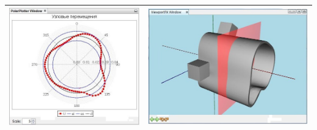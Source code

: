 \documentclass[14pt,oneside,final]{extreport}
\begin{document}
\begin{appendices}
\begin{table}[]
{{\begin{tabu}[]{|c|c|}
					\includegraphics[scale=0.55]{img/plane-position-test3} & \includegraphics[scale=0.55]{img/plane-position-test3-model}  \\ 
					\hline
				\end{tabu}
			}
	}\end{table}
	

\end{appendices}
\end{document}
